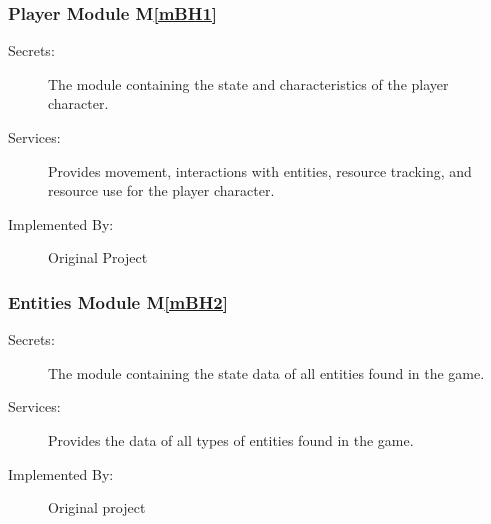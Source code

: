 \documentclass[12pt, titlepage]{article}
\newcommand{\mref}[1]{M\ref{#1}}
\begin{document}
\subsubsection{Player Module \mref{mBH1}}

\begin{description}
\item[Secrets:] The module containing the state and characteristics of the player character.
\item[Services:] Provides movement, interactions with entities, resource tracking, and resource use for the player character.
\item[Implemented By:] Original Project
\end{description}

\subsubsection{Entities Module \mref{mBH2}}

\begin{description}
\item[Secrets:] The module containing the state data of all entities found in the game.
\item[Services:] Provides the data of all types of entities found in the game.
\item[Implemented By:] Original project
\end{description}
\end{document}
